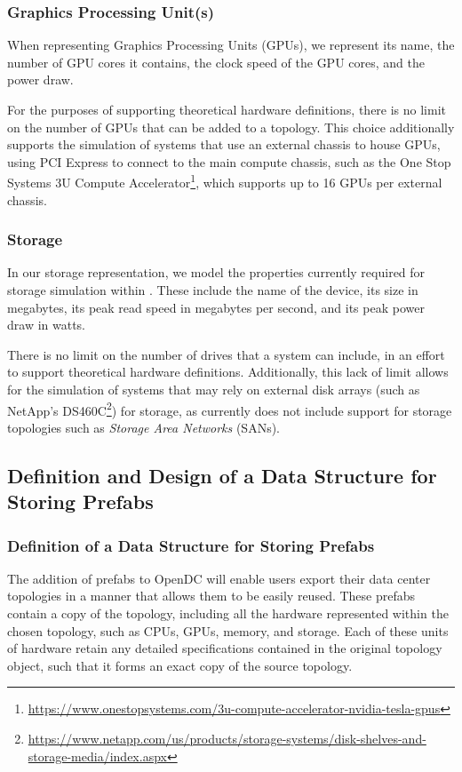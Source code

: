 \documentclass[11pt]{article}
\begin{document}
		\subsubsection{Graphics Processing Unit(s)}
			When representing Graphics Processing Units (GPUs), we represent its name, the number of GPU cores it contains, the clock speed of the GPU cores, and the power draw.

			For the purposes of supporting theoretical hardware definitions, there is no limit on the number of GPUs that can be added to a topology. 
			This choice additionally supports the simulation of systems that use an external chassis to house GPUs, using PCI Express to connect to the main compute chassis, such as the One Stop Systems 3U Compute Accelerator\footnote{\url{https://www.onestopsystems.com/3u-compute-accelerator-nvidia-tesla-gpus}}, which supports up to 16 GPUs per external chassis. 

		\subsubsection{Storage}
			In our storage representation, we model the properties currently required for storage simulation within \opendc{}.
			These include the name of the device, its size in megabytes, its peak read speed in megabytes per second, and its peak power draw in watts.
			
			There is no limit on the number of drives that a system can include, in an effort to support theoretical hardware definitions.
			Additionally, this lack of limit allows for the simulation of systems that may rely on external disk arrays (such as NetApp's DS460C\footnote{\url{https://www.netapp.com/us/products/storage-systems/disk-shelves-and-storage-media/index.aspx}}) for storage, as \opendc{} currently does not include support for storage topologies such as \textit{Storage Area Networks} (SANs).
	
	\subsection{Definition and Design of a Data Structure for Storing Prefabs}

		\subsubsection{Definition of a Data Structure for Storing Prefabs}
			The addition of prefabs to OpenDC will enable users export their data center topologies in a manner that allows them to be easily reused.
			These prefabs contain a copy of the topology, including all the hardware represented within the chosen topology, such as CPUs, GPUs, memory, and storage.
			Each of these units of hardware retain any detailed specifications contained in the original topology object, such that it forms an exact copy of the source topology.
\end{document}
